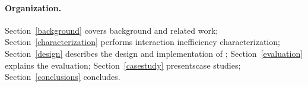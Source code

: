 


\paragraph{Organization.}
 Section~\ref{background} covers background and related work; Section~\ref{characterization} performs interaction inefficiency characterization; Section~\ref{design} describes the design and implementation of \tool; Section~\ref{evaluation} explains the evaluation; Section~\ref{casestudy} presentscase studies; Section~\ref{conclusions} concludes. 
 








